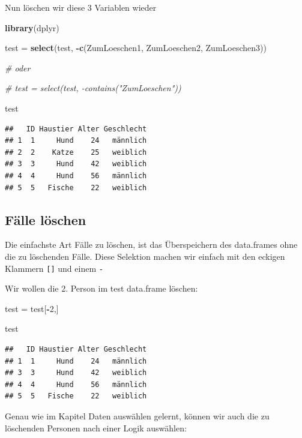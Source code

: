 \documentclass[
]{book}
\newenvironment{Shaded}{\begin{snugshade}}{\end{snugshade}}
\newcommand{\CommentTok}[1]{\textcolor[rgb]{0.56,0.35,0.01}{\textit{#1}}}
\newcommand{\DecValTok}[1]{\textcolor[rgb]{0.00,0.00,0.81}{#1}}
\newcommand{\FunctionTok}[1]{\textcolor[rgb]{0.13,0.29,0.53}{\textbf{#1}}}
\newcommand{\NormalTok}[1]{#1}
\newcommand{\OtherTok}[1]{\textcolor[rgb]{0.56,0.35,0.01}{#1}}
\newcommand{\SpecialCharTok}[1]{\textcolor[rgb]{0.81,0.36,0.00}{\textbf{#1}}}
\begin{document}
Nun löschen wir diese 3 Variablen wieder

\begin{Shaded}
\begin{Highlighting}[]
\FunctionTok{library}\NormalTok{(dplyr)}

\NormalTok{test }\OtherTok{=} \FunctionTok{select}\NormalTok{(test, }\SpecialCharTok{{-}}\FunctionTok{c}\NormalTok{(ZumLoeschen1, ZumLoeschen2, ZumLoeschen3))}

\CommentTok{\# oder }

\CommentTok{\# test = select(test, {-}contains("ZumLoeschen"))}

\NormalTok{test}
\end{Highlighting}
\end{Shaded}

\begin{verbatim}
##   ID Haustier Alter Geschlecht
## 1  1     Hund    24   männlich
## 2  2    Katze    25   weiblich
## 3  3     Hund    42   weiblich
## 4  4     Hund    56   männlich
## 5  5   Fische    22   weiblich
\end{verbatim}

\subsection{Fälle löschen}\label{fuxe4lle-luxf6schen}

Die einfachste Art Fälle zu löschen, ist das Überspeichern des data.frames ohne die zu löschenden Fälle. Diese Selektion machen wir einfach mit den eckigen Klammern \texttt{{[}{]}} und einem \texttt{-}

Wir wollen die 2. Person im test data.frame löschen:

\begin{Shaded}
\begin{Highlighting}[]
\NormalTok{test }\OtherTok{=}\NormalTok{ test[}\SpecialCharTok{{-}}\DecValTok{2}\NormalTok{,]}

\NormalTok{test}
\end{Highlighting}
\end{Shaded}

\begin{verbatim}
##   ID Haustier Alter Geschlecht
## 1  1     Hund    24   männlich
## 3  3     Hund    42   weiblich
## 4  4     Hund    56   männlich
## 5  5   Fische    22   weiblich
\end{verbatim}

Genau wie im Kapitel Daten auswählen gelernt, können wir auch die zu löschenden Personen nach einer Logik auswählen:
\end{document}
